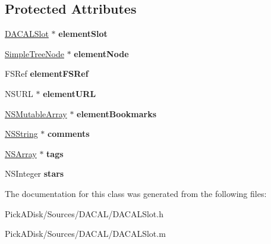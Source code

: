 \subsection*{Protected Attributes}
\begin{DoxyCompactItemize}
\item 
\hypertarget{interface_d_a_c_a_l_slot_element_a61b3336dbf8c0bcc5faeb83047ef80b2}{
\hyperlink{interface_d_a_c_a_l_slot}{DACALSlot} $\ast$ {\bfseries elementSlot}}
\label{interface_d_a_c_a_l_slot_element_a61b3336dbf8c0bcc5faeb83047ef80b2}

\item 
\hypertarget{interface_d_a_c_a_l_slot_element_ad3f7a84519f1000a64c9c1ac5ab131d3}{
\hyperlink{class_simple_tree_node}{SimpleTreeNode} $\ast$ {\bfseries elementNode}}
\label{interface_d_a_c_a_l_slot_element_ad3f7a84519f1000a64c9c1ac5ab131d3}

\item 
\hypertarget{interface_d_a_c_a_l_slot_element_aafe2b780d1a7cb5365f516f4417d665e}{
FSRef {\bfseries elementFSRef}}
\label{interface_d_a_c_a_l_slot_element_aafe2b780d1a7cb5365f516f4417d665e}

\item 
\hypertarget{interface_d_a_c_a_l_slot_element_ab35ad7597d9c62f2da84104c640b2533}{
NSURL $\ast$ {\bfseries elementURL}}
\label{interface_d_a_c_a_l_slot_element_ab35ad7597d9c62f2da84104c640b2533}

\item 
\hypertarget{interface_d_a_c_a_l_slot_element_a8d69f161722a6065e80bb6ec43973da3}{
\hyperlink{class_n_s_mutable_array}{NSMutableArray} $\ast$ {\bfseries elementBookmarks}}
\label{interface_d_a_c_a_l_slot_element_a8d69f161722a6065e80bb6ec43973da3}

\item 
\hypertarget{interface_d_a_c_a_l_slot_element_a8104d4b0f1520d474997ac2edfcc7422}{
\hyperlink{class_n_s_string}{NSString} $\ast$ {\bfseries comments}}
\label{interface_d_a_c_a_l_slot_element_a8104d4b0f1520d474997ac2edfcc7422}

\item 
\hypertarget{interface_d_a_c_a_l_slot_element_a5ca7172a6cb97c7081b874479c556365}{
\hyperlink{class_n_s_array}{NSArray} $\ast$ {\bfseries tags}}
\label{interface_d_a_c_a_l_slot_element_a5ca7172a6cb97c7081b874479c556365}

\item 
\hypertarget{interface_d_a_c_a_l_slot_element_aed73103a29c277edfe1b16794296de8d}{
NSInteger {\bfseries stars}}
\label{interface_d_a_c_a_l_slot_element_aed73103a29c277edfe1b16794296de8d}

\end{DoxyCompactItemize}


The documentation for this class was generated from the following files:\begin{DoxyCompactItemize}
\item 
PickADisk/Sources/DACAL/DACALSlot.h\item 
PickADisk/Sources/DACAL/DACALSlot.m\end{DoxyCompactItemize}
